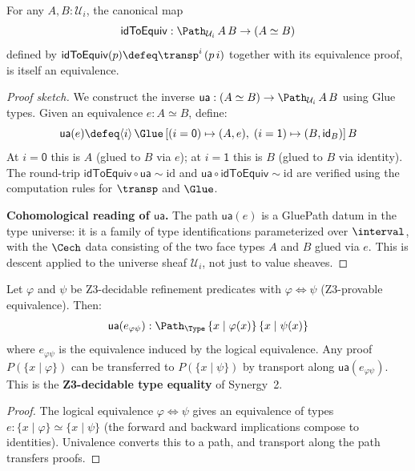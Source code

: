 \begin{theorem}[Univalence]
\label{thm:univalence}
For any $A, B : \mathcal{U}_i$, the canonical map
\[
  \mathsf{idToEquiv} : \Path_{\mathcal{U}_i}\, A\, B \to (A \simeq B)
\]
defined by $\mathsf{idToEquiv}(p) \defeq \transp^i\, (p\,i)$ together
with its equivalence proof, is itself an equivalence.
\end{theorem}

\begin{proof}[Proof sketch]
We construct the inverse $\mathsf{ua} : (A \simeq B) \to
\Path_{\mathcal{U}_i}\, A\, B$ using Glue types.  Given an equivalence
$e : A \simeq B$, define:
\[
  \mathsf{ua}(e) \defeq \langle i \rangle\,
    \Glue\,[(i = \mathsf{0}) \mapsto (A, e),\;
                     (i = \mathsf{1}) \mapsto (B, \mathsf{id}_B)]\, B
\]
At $i = \mathsf{0}$ this is $A$ (glued to $B$ via $e$); at $i = \mathsf{1}$
this is $B$ (glued to $B$ via identity).  The round-trip
$\mathsf{idToEquiv} \circ \mathsf{ua} \sim \mathrm{id}$ and
$\mathsf{ua} \circ \mathsf{idToEquiv} \sim \mathrm{id}$ are verified
using the computation rules for $\transp$ and $\Glue$.

\medskip\noindent\textbf{Cohomological reading of $\mathsf{ua}$.}
The path $\mathsf{ua}(e)$ is a GluePath datum in the type universe: it
is a family of type identifications parameterized over $\interval$, with
the $\Cech$ data consisting of the two face types $A$ and $B$ glued via $e$.
This is descent applied to the universe sheaf $\mathcal{U}_i$, not just
to value sheaves.
\end{proof}

\begin{corollary}
\label{cor:ua-transfer}
Let $\varphi$ and $\psi$ be Z3-decidable refinement predicates with
$\varphi \Leftrightarrow \psi$ (Z3-provable equivalence).  Then:
\[
  \mathsf{ua}(e_{\varphi\psi}) : \Path_\Type\,
  \{x \mid \varphi(x)\}\, \{x \mid \psi(x)\}
\]
where $e_{\varphi\psi}$ is the equivalence induced by the logical
equivalence.  Any proof $P(\{x \mid \varphi\})$ can be transferred to
$P(\{x \mid \psi\})$ by transport along $\mathsf{ua}(e_{\varphi\psi})$.
This is the \textbf{Z3-decidable type equality} of Synergy~2.
\end{corollary}

\begin{proof}
The logical equivalence $\varphi \Leftrightarrow \psi$ gives an
equivalence of types $e : \{x \mid \varphi\} \simeq \{x \mid \psi\}$
(the forward and backward implications compose to identities).
Univalence converts this to a path, and transport along the path
transfers proofs.
\end{proof}


